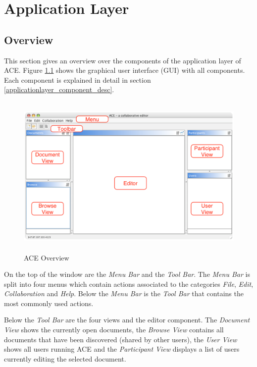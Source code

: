 \chapter{Application Layer}
\label{chapter:applicationlayer}

\section{Overview}
This section gives an overview over the components of the application layer of ACE. Figure \ref{applicationlayer_ace_overview} shows the graphical user interface (GUI) with all components. Each component is explained in detail in section \ref{applicationlayer_component_desc}.
\begin{figure}[H]
\begin{center}
  \includegraphics[height=3.135in, width=5.01in]{../images/finalreport/application_ace_overview.eps}
\caption{ACE Overview}
\label{applicationlayer_ace_overview}
\end{center}
\end{figure}
On the top of the window are the \emph{Menu Bar} and the \emph{Tool Bar}. The \emph{Menu Bar} is split into four menus which contain actions associated to the categories \emph{File}, \emph{Edit}, \emph{Collaboration} and \emph{Help}. Below the \emph{Menu Bar} is the \emph{Tool Bar} that contains the most commonly used actions.

Below the \emph{Tool Bar} are the four views and the editor component. The \emph{Document View} shows the currently open documents, the \emph{Browse View} contains all documents that have been discovered (shared by other users), the \emph{User View} shows all users running ACE and the \emph{Participant View} displays a list of users currently editing the selected document.


